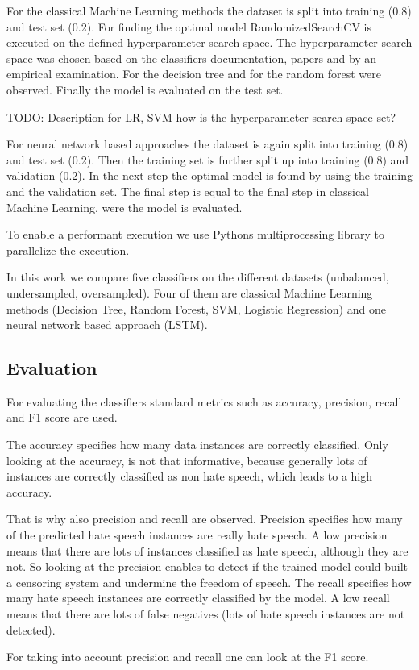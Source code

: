 For the classical Machine Learning methods the dataset is split into training (0.8) and test set (0.2). For finding the optimal model Randomized\-SearchCV is executed on the defined hyperparameter search space. The hyperparameter search space was chosen based on the classifiers doc\-u\-men\-ta\-tion, papers and by an empirical examination. For the decision tree \cite{mantovani2019empirical} and for the random forest \cite{probstHyperparametersTuningStrategies2019} were observed. Finally the model is evaluated on the test set.

TODO: Description for LR, SVM how is the hyperparameter search space set?

For neural network based approaches the dataset is again split into training (0.8) and test set (0.2). Then the training set is further split up into training (0.8) and validation (0.2). In the next step the optimal model is found by using the training and the validation set. The final step is equal to the final step in classical Machine Learning, were the model is evaluated.

To enable a performant execution we use Pythons multiprocessing library to parallelize the execution.

In this work we compare five classifiers on the different datasets (unbalanced, undersampled, oversampled). Four of them are classical Machine Learning methods (Decision Tree, Random Forest, SVM, Logistic Regression) and one neural network based approach (LSTM).


\subsection{Evaluation}
\label{ch:approachE}

For evaluating the classifiers standard metrics such as accuracy, precision, recall and F1 score are used.

The accuracy specifies how many data instances are correctly classified. Only looking at the accuracy, is not that informative, because generally lots of instances are correctly classified as non hate speech, which leads to a high accuracy.

That is why also precision and recall are observed. Precision specifies how many of the predicted hate speech instances are really hate speech. A low precision means that there are lots of instances classified as hate speech, although they are not. So looking at the precision enables to detect if the trained model could built a censoring system and undermine the freedom of speech. The recall specifies how many hate speech instances are correctly classified by the model. A low recall means that there are lots of false negatives (lots of hate speech instances are not detected).

For taking into account precision and recall one can look at the F1 score. 

